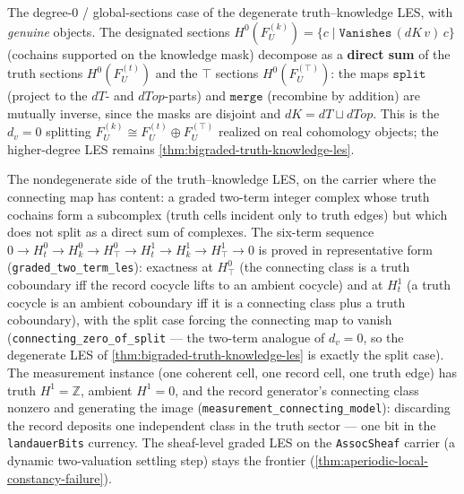 \begin{theorem}\label{thm:bigraded-truth-knowledge-decomposition}\leanok{}
The degree-0 / global-sections case of the degenerate truth--knowledge LES, with \emph{genuine}
objects. The designated sections
$H^0(F_U^{(k)}) = \{c \mid \texttt{Vanishes}\,(dK\,v)\,c\}$ (cochains supported on the knowledge mask)
decompose as a \textbf{direct sum} of the truth sections $H^0(F_U^{(t)})$ and the $\top$ sections
$H^0(F_U^{(\top)})$: the maps $\texttt{split}$ (project to the $dT$- and $dTop$-parts) and
$\texttt{merge}$ (recombine by addition) are mutually inverse, since the masks are disjoint and
$dK = dT \sqcup dTop$. This is the $d_v=0$ splitting $F_U^{(k)} \cong F_U^{(t)} \oplus F_U^{(\top)}$
realized on real cohomology objects; the higher-degree LES remains
\cref{thm:bigraded-truth-knowledge-les}.
\end{theorem}

\begin{theorem}\label{thm:truth-knowledge-connecting}\leanok{}
The nondegenerate side of the truth--knowledge LES, on the carrier where the connecting map has
content: a graded two-term integer complex whose truth cochains form a subcomplex (truth cells
incident only to truth edges) but which does not split as a direct sum of complexes. The six-term
sequence $0\to H^0_t\to H^0_k\to H^0_\top\to H^1_t\to H^1_k\to H^1_\top\to 0$ is proved in
representative form (\texttt{graded\_two\_term\_les}): exactness at $H^0_\top$ (the connecting
class is a truth coboundary iff the record cocycle lifts to an ambient cocycle) and at $H^1_t$
(a truth cocycle is an ambient coboundary iff it is a connecting class plus a truth coboundary),
with the split case forcing the connecting map to vanish
(\texttt{connecting\_zero\_of\_split} --- the two-term analogue of $d_v=0$, so the degenerate LES
of \cref{thm:bigraded-truth-knowledge-les} is exactly the split case). The measurement instance
(one coherent cell, one record cell, one truth edge) has truth $H^1=\mathbb{Z}$, ambient $H^1=0$,
and the record generator's connecting class nonzero and generating the image
(\texttt{measurement\_connecting\_model}): discarding the record deposits one independent class
in the truth sector --- one bit in the \texttt{landauerBits} currency. The sheaf-level graded LES
on the \texttt{AssocSheaf} carrier (a dynamic two-valuation settling step) stays the frontier
(\cref{thm:aperiodic-local-constancy-failure}).
\end{theorem}

